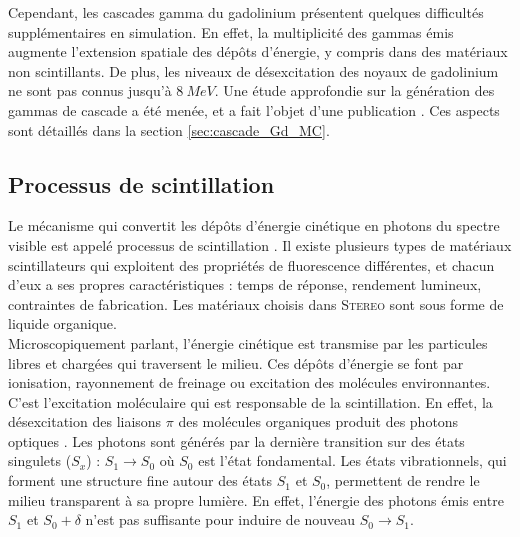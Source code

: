 Cependant, les cascades gamma du gadolinium présentent quelques difficultés supplémentaires en simulation. En effet, la multiplicité des gammas émis augmente l'extension spatiale des dépôts d'énergie, y compris dans des matériaux non scintillants. De plus, les niveaux de désexcitation des noyaux de gadolinium ne sont pas connus jusqu'à $\SI{8}{MeV}$. Une étude approfondie sur la génération des gammas de cascade a été menée, et a fait l'objet d'une publication \cite{AlmazanMolina:2019aoc}. Ces aspects sont détaillés dans la section \ref{sec:cascade_Gd_MC}.\\ 

\bigbreak 

\subsection{Processus de scintillation} 
\label{seq:scintillation} 

Le mécanisme qui convertit les dépôts d'énergie cinétique en photons du spectre visible est appelé \og processus de scintillation \fg{}. Il existe plusieurs types de matériaux scintillateurs qui exploitent des propriétés de fluorescence différentes, et chacun d'eux a ses propres caractéristiques : temps de réponse, rendement lumineux, contraintes de fabrication. Les matériaux choisis dans \textsc{Stereo} sont sous forme de liquide organique.\\ 

Microscopiquement parlant, l'énergie cinétique est transmise par les particules libres et chargées qui traversent le milieu. Ces dépôts d'énergie se font par ionisation, rayonnement de freinage ou excitation des molécules environnantes. C'est l'excitation moléculaire qui est responsable de la scintillation. En effet, la désexcitation des liaisons $\pi$ des molécules organiques produit des photons optiques \cite{Birks:1964zz}. Les photons sont générés par la dernière transition sur des états singulets ($S_x$) : $S_1 \rightarrow S_0$ où $S_0$ est l'état fondamental. Les états vibrationnels, qui forment une structure fine autour des états $S_1$ et $S_0$, permettent de rendre le milieu transparent à sa propre lumière. En effet, l'énergie des photons émis entre $S_1$ et $S_0 + \delta$ n'est pas suffisante pour induire de nouveau $S_0 \rightarrow S_1$.\\ 

